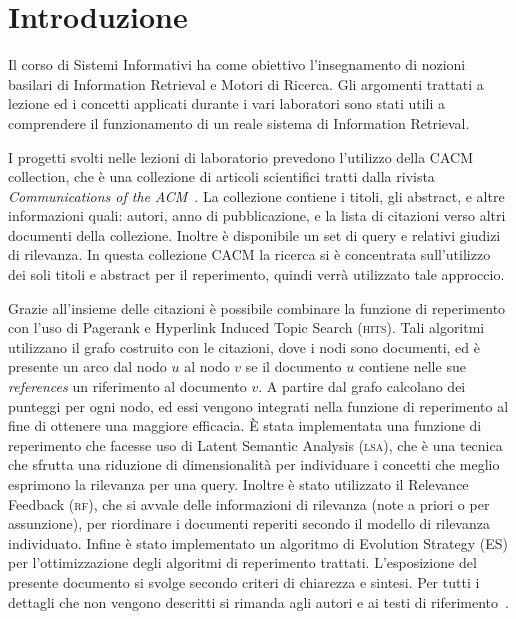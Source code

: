 \section{Introduzione}
\label{sec:introduzione}

Il corso di Sistemi Informativi ha come obiettivo l'insegnamento di nozioni basilari di Information Retrieval e Motori di Ricerca. Gli argomenti trattati a lezione ed i concetti applicati durante i vari laboratori sono stati utili a comprendere il funzionamento di un reale sistema di Information Retrieval.

I progetti svolti nelle lezioni di laboratorio prevedono l'utilizzo della CACM collection, che \`e una collezione di articoli scientifici tratti dalla rivista \textit{Communications of the ACM}~\cite{ACMCollection}. La collezione contiene i titoli, gli abstract, e altre informazioni quali: autori, anno di pubblicazione, e la lista di citazioni verso altri documenti della collezione. Inoltre \`e disponibile un set di query e relativi giudizi di rilevanza. In questa collezione CACM la ricerca si \`e concentrata sull'utilizzo dei soli titoli e abstract per il reperimento, quindi verr\`a utilizzato tale approccio. 

Grazie all'insieme delle citazioni \`e possibile combinare la funzione di reperimento con l'uso di Pagerank e Hyperlink Induced Topic Search (\textsc{hits}). Tali algoritmi utilizzano il grafo costruito con le citazioni, dove i nodi sono  documenti, ed \`e presente un arco dal nodo $u$ al nodo $v$ se il documento $u$ contiene nelle sue \textit{references} un riferimento al documento $v$. A partire dal grafo calcolano dei punteggi per ogni nodo, ed essi vengono integrati nella funzione di reperimento al fine di ottenere una maggiore efficacia. 
\`E stata implementata una funzione di reperimento che facesse uso di Latent Semantic Analysis (\textsc{lsa}), che \`e una tecnica che sfrutta una riduzione di dimensionalit\`a per individuare i concetti che meglio esprimono la rilevanza per una query. Inoltre \`e stato utilizzato il Relevance Feedback (\textsc{rf}), che si avvale delle informazioni di rilevanza (note a priori o per assunzione), per riordinare i documenti reperiti secondo il modello di rilevanza individuato.
Infine \`e stato implementato un algoritmo di Evolution Strategy (ES) per l'ottimizzazione degli algoritmi di reperimento trattati. L'esposizione del presente documento si svolge secondo criteri di chiarezza e sintesi. Per tutti i dettagli che non vengono descritti si rimanda agli autori e ai testi di riferimento~\cite{manning2008introduction,melucci2013information,croft2010search}.
